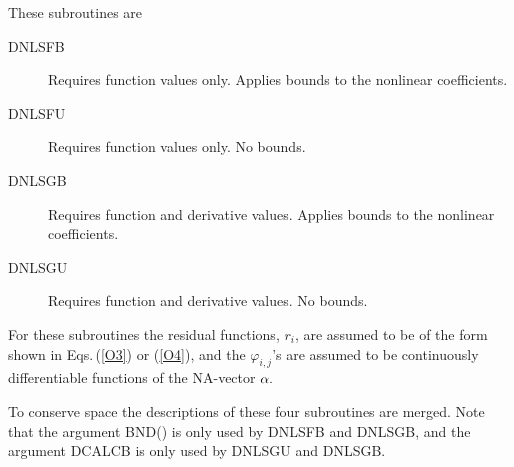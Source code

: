 \documentclass[twoside]{MATH77}
\begin{document}
These subroutines are
\begin{description}
\item[DNLSFB]  Requires function values only. Applies bounds to the
nonlinear coefficients.

\item[DNLSFU]  Requires function values only. No bounds.

\item[DNLSGB]  Requires function and derivative values. Applies bounds to
the nonlinear coefficients.

\item[DNLSGU]  Requires function and derivative values. No bounds.
\end{description}
For these subroutines the residual functions, $r_i$, are assumed to be of
the form shown in Eqs.\,(\ref{O3}) or (\ref{O4}), and the $\varphi
_{i,j}$'s are assumed to be continuously differentiable functions of
the NA-vector ${\bf \alpha }.$

To conserve space the descriptions of these four subroutines are merged.
Note that the argument BND() is only used by DNLSFB and DNLSGB, and the
argument DCALCB is only used by DNLSGU and DNLSGB.
\end{document}
